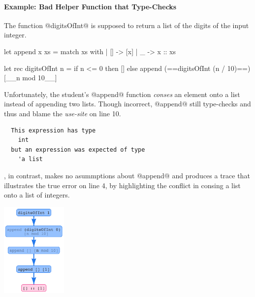 \paragraph{Example: Bad Helper Function that Type-Checks}
%
The function @digitsOfInt@ is supposed to return a list of
the digits of the input integer.
%
\begin{ecode}
  let append x xs =
    match xs with
    | [] -> [x]
    | _  -> x :: xs

  let rec digitsOfInt n =
    if n <= 0 then
      []
    else
      append (==digitsOfInt (n / 10)==)
             [__n mod 10__]
\end{ecode}
%
Unfortunately, the student's @append@ function \emph{conses} an element
onto a list instead of appending two lists.
%
Though incorrect, @append@ still type-checks and thus \ocaml and
\sherrloc blame the \emph{use-site} on line 10.
%
\begin{verbatim}
  This expression has type
    int
  but an expression was expected of type
    'a list
\end{verbatim}
%
\toolname, in contrast, makes no asummptions about @append@ and produces
a trace that illustrates the true error on line 4, by
highlighting the conflict in consing a list onto a list of integers.
%
\begin{center}
  \includegraphics[height=175px]{digitsOfInt.png}
\end{center}
%

